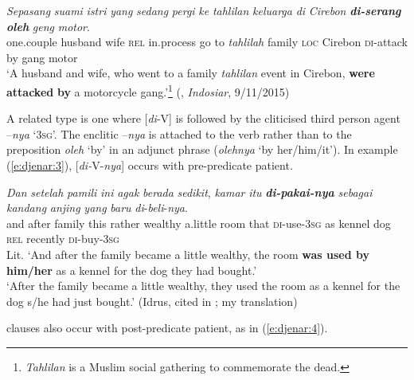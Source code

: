 \documentclass[output=paper
,modfonts
,nonflat]{langsci/langscibook}
\begin{document}
\begin{exe}
	\ex\label{e:djenar:2}
	\gll \textit{Sepasang}   \textit{suami}     \textit{istri}  \textit{yang}   \textit{sedang}   \textit{pergi}   \textit{ke} \textit{tahlilan}   \textit{keluarga}   \textit{di}   \textit{Cirebon} \textbf{\textit{di-serang}} \textbf{\textit{oleh}} \textit{geng}   \textit{motor}.\\
	one.couple  husband  wife  \textsc{rel}  in.process  go  to \textit{tahlilah} family    \textsc{loc}   Cirebon  \textsc{di}-attack  by gang  motor\\	
	\glt ‘A husband and wife, who went to a family \textit{tahlilan} event in Cirebon, \textbf{were attacked} \textbf{by} a motorcycle gang.’\footnote{\textit{Tahlilan} is a Muslim social gathering to commemorate the dead.}  \hfill(, \textit{Indosiar}, 9/11/2015)
\end{exe}

\noindent
A related  type is one where [\textit{di}-V] is followed by the cliticised third person agent –\textit{nya} ‘\textsc{3sg}’. The enclitic –\textit{nya} is attached to the verb rather than to the preposition \textit{oleh} ‘by’ in an adjunct phrase (\textit{olehnya} ‘by her/him/it’). In example (\ref{e:djenar:3}), [\textit{di-}V-\textit{nya}] occurs with pre-predicate patient. 

\begin{exe}
	\ex\label{e:djenar:3}
	\gll \textit{Dan}  \textit{setelah}    \textit{pamili}  \textit{ini}  \textit{agak}  \textit{berada}    \textit{sedikit}, \textit{kamar}  \textit{itu} \textbf{\textit{di-pakai-nya}} \textit{sebagai}  \textit{kandang}  \textit{anjing}  \textit{yang} \textit{baru}    \textit{di}-\textit{beli}-\textit{nya}.\\
	and  after    family  this  rather  wealthy  a.little room  that  \textsc{di}-use-3\textsc{sg} as    kennel    dog  \textsc{rel} recently  \textsc{di}-buy-3\textsc{sg}\\
	Lit. ‘And after the family became a little wealthy, the room \textbf{was used by him/her} as a kennel for the dog they had bought.’\\
	\glt ‘After the family became a little wealthy, they used the room as a kennel for the dog s/he had just bought.’ \hfill(Idrus, cited in \citealt[204]{Kaswanti1988}; my translation)
\end{exe}

 clauses also occur with post-predicate patient, as in (\ref{e:djenar:4}). 
\end{document}
